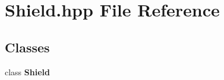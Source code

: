 \section{Shield.\-hpp File Reference}
\label{_shield_8hpp}
\subsection*{Classes}
\begin{DoxyCompactItemize}
\item 
class {\bf Shield}
\end{DoxyCompactItemize}

